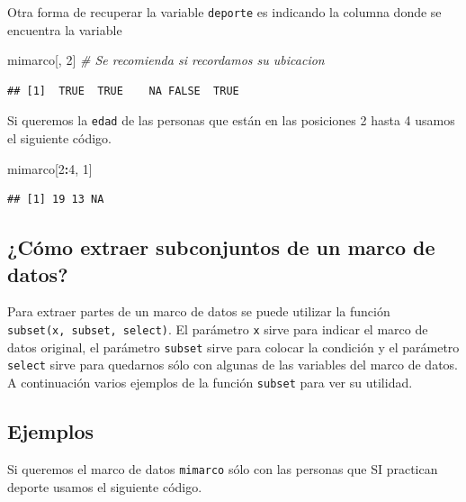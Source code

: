 \documentclass[10pt,]{krantz}
\makeatletter
\newenvironment{Shaded}{\begin{snugshade}}{\end{snugshade}}
\newcommand{\DecValTok}[1]{\textcolor[rgb]{0.00,0.00,0.81}{#1}}
\newcommand{\CommentTok}[1]{\textcolor[rgb]{0.56,0.35,0.01}{\textit{#1}}}
\newcommand{\OperatorTok}[1]{\textcolor[rgb]{0.81,0.36,0.00}{\textbf{#1}}}
\newcommand{\NormalTok}[1]{#1}
\newenvironment{kframe}{%
\medskip{}
\setlength{\fboxsep}{.8em}
 \def\at@end@of@kframe{}%
 \ifinner\ifhmode%
  \def\at@end@of@kframe{\end{minipage}}%
  \begin{minipage}{\columnwidth}%
 \fi\fi%
 \def\FrameCommand##1{\hskip\@totalleftmargin \hskip-\fboxsep
 \colorbox{shadecolor}{##1}\hskip-\fboxsep
     \hskip-\linewidth \hskip-\@totalleftmargin \hskip\columnwidth}%
 \MakeFramed {\advance\hsize-\width
   \@totalleftmargin\z@ \linewidth\hsize
   \@setminipage}}%
 {\par\unskip\endMakeFramed%
 \at@end@of@kframe}
\renewenvironment{Shaded}{\begin{kframe}}{\end{kframe}}
\makeatother
\begin{document}
Otra forma de recuperar la variable \texttt{deporte} es indicando la
columna donde se encuentra la variable

\begin{Shaded}
\begin{Highlighting}[]
\NormalTok{mimarco[, }\DecValTok{2}\NormalTok{]  }\CommentTok{# Se recomienda si recordamos su ubicacion}
\end{Highlighting}
\end{Shaded}

\begin{verbatim}
## [1]  TRUE  TRUE    NA FALSE  TRUE
\end{verbatim}

Si queremos la \texttt{edad} de las personas que están en las posiciones
2 hasta 4 usamos el siguiente código.

\begin{Shaded}
\begin{Highlighting}[]
\NormalTok{mimarco[}\DecValTok{2}\OperatorTok{:}\DecValTok{4}\NormalTok{, }\DecValTok{1}\NormalTok{]}
\end{Highlighting}
\end{Shaded}

\begin{verbatim}
## [1] 19 13 NA
\end{verbatim}

\subsection{\texorpdfstring{¿Cómo extraer subconjuntos de un marco de
datos?
}{¿Cómo extraer subconjuntos de un marco de datos? }}\label{como-extraer-subconjuntos-de-un-marco-de-datos}

Para extraer partes de un marco de datos se puede utilizar la función
\texttt{subset(x,\ subset,\ select)}. El parámetro \texttt{x} sirve para
indicar el marco de datos original, el parámetro \texttt{subset} sirve
para colocar la condición y el parámetro \texttt{select} sirve para
quedarnos sólo con algunas de las variables del marco de datos. A
continuación varios ejemplos de la función \texttt{subset} para ver su
utilidad.

\subsection*{Ejemplos}\label{ejemplos}


Si queremos el marco de datos \texttt{mimarco} sólo con las personas que
SI practican deporte usamos el siguiente código.
\end{document}
